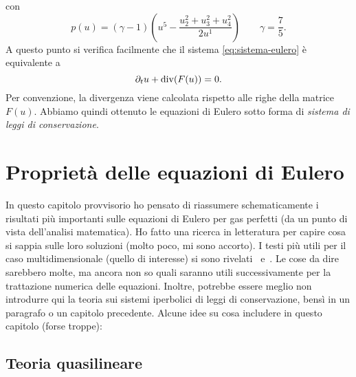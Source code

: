 con
\begin{equation*}
p(u) = (\gamma-1) \left( u^5 - \frac{u_2^2+u_3^2+u_4^2}{2 u^1} \right)
\qquad \gamma = \frac{7}{5}.
\end{equation*}
A questo punto si verifica facilmente che il sistema \eqref{eq:sistema-eulero}
è equivalente a
\[
\partial_t u + \operatorname{div}(F(u)) = 0.
\]
Per convenzione, la divergenza viene calcolata rispetto alle righe
della matrice $F(u)$.
Abbiamo quindi ottenuto le equazioni di Eulero sotto forma di
\emph{sistema di leggi di conservazione}.


\section{Proprietà delle equazioni di Eulero}

In questo capitolo provvisorio ho pensato di riassumere schematicamente
i risultati più importanti sulle equazioni di Eulero per gas perfetti
(da un punto di vista dell'analisi matematica).
Ho fatto una ricerca in letteratura per capire cosa si sappia
sulle loro soluzioni (molto poco, mi sono accorto).
I testi più utili per il caso multidimensionale (quello di interesse)
si sono rivelati~\cite{serre} e~\cite{benzoni-gavage-serre}.
Le cose da dire sarebbero molte, ma ancora non so quali saranno
utili successivamente per la trattazione numerica delle equazioni.
Inoltre, potrebbe essere meglio non introdurre qui
la teoria sui sistemi iperbolici di leggi di conservazione,
bensì in un paragrafo o un capitolo precedente.
Alcune idee su cosa includere in questo capitolo (forse troppe):

\subsection*{Teoria quasilineare}

